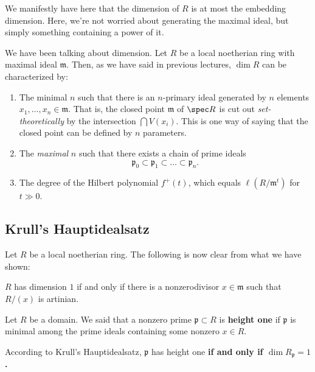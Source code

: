 \begin{remark} 
We manifestly have here that the dimension of $R$ is at most the embedding
dimension. Here, we're not worried about generating the maximal ideal, but
simply something containing a power of it.
\end{remark} 

We have been talking about dimension. Let $R$ be a local noetherian ring with
maximal ideal $\mathfrak{m}$. Then, as we have said in previous lectures, $\dim R$ can be characterized by:
\begin{enumerate}
\item The minimal $n$ such that there is an $n$-primary ideal generated by $n$
elements $x_1, \dots, x_n \in \mathfrak{m}$. That is, the closed point
$\mathfrak{m}$ of
$\spec R$ is cut out \emph{set-theoretically} by the intersection $\bigcap
V(x_i)$. This is one way of saying that the closed point can be defined by $n$
parameters. 
\item The \emph{maximal} $n$ such that there exists a chain of prime ideals
\[ \mathfrak{p}_0 \subset \mathfrak{p}_1 \subset \dots \subset \mathfrak{p}_n. \]
\item The degree of the Hilbert polynomial $f^+(t)$, which equals
$\ell(R/\mathfrak{m}^t)$ for $t \gg 0$.
\end{enumerate}


\subsection{Krull's Hauptidealsatz}


Let $R$ be a local noetherian ring.
The following is now clear from what we have shown:

\begin{theorem} \label{hauptv1}
$R$ has dimension $1$ if and only if there is a nonzerodivisor $x \in \mathfrak{m}$ such that
$R/(x)$ is artinian.
\end{theorem} 



\begin{remark} 
Let $R$ be a domain. We said that a nonzero prime $\mathfrak{p} \subset R$ is
\textbf{height one} if $\mathfrak{p}$ is minimal among the prime ideals
containing some nonzero $x \in R$. 

According to Krull's Hauptidealsatz, $\mathfrak{p}$ has height one \textbf{if
and only if $\dim R_{\mathfrak{p}} = 1$.}
\end{remark} 


